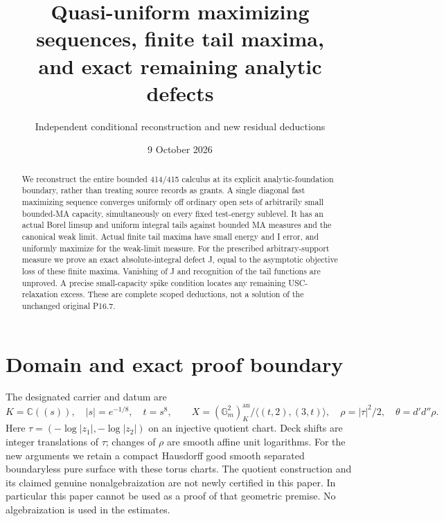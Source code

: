 \documentclass[11pt]{article}
\title{Quasi-uniform maximizing sequences, finite tail maxima,\\and exact remaining analytic defects}
\author{Independent conditional reconstruction and new residual deductions}
\date{9 October 2026}
\newcommand{\DD}{d'd''}
\begin{document}
\maketitle
\begin{abstract}
We reconstruct the entire bounded 414/415 calculus at its explicit
analytic-foundation boundary, rather than treating source records as
grants. A single diagonal fast maximizing sequence converges uniformly
off ordinary open sets of arbitrarily small bounded-MA capacity,
simultaneously on every fixed test-energy sublevel. It has an actual
Borel limsup and uniform integral tails against bounded MA measures
and the canonical weak limit. Actual finite tail maxima have small
energy and I error, and uniformly maximize for the weak-limit measure.
For the prescribed arbitrary-support measure we prove an exact
absolute-integral defect J, equal to the asymptotic objective loss of
these finite maxima. Vanishing of J and recognition of the tail
functions are unproved. A precise small-capacity spike condition
locates any remaining USC-relaxation excess. These are complete scoped
deductions, not a solution of the unchanged original P16.7.
\end{abstract}

\section{Domain and exact proof boundary}
The designated carrier and datum are
\[
 K=\mathbb C((s)),\quad |s|=e^{-1/8},\quad t=s^8,\qquad
 X=(\mathbb G_m^2)^{\mathrm{an}}_K/\langle(t,2),(3,t)\rangle,
 \quad \rho=|\tau|^2/2,\quad\theta=\DD\rho.
\]
Here $\tau=(-\log|z_1|,-\log|z_2|)$ on an injective quotient
chart. Deck shifts are integer translations of $\tau$; changes of
$\rho$ are smooth affine unit logarithms. For the new arguments we
retain a compact Hausdorff good smooth separated boundaryless pure
surface with these torus charts. The quotient construction and its
claimed genuine nonalgebraization are not newly certified in this paper.
In particular this paper cannot be used as a proof of that geometric
premise. No algebraization is used in the estimates.
\end{document}
